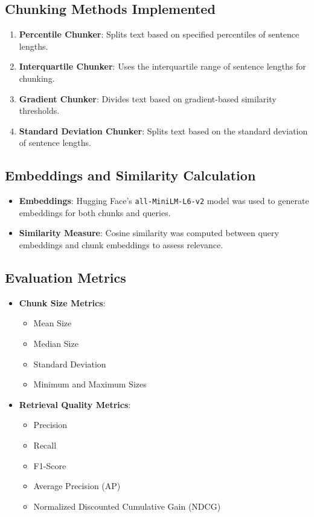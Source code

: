 \documentclass[12pt]{article}
\begin{document}
\subsection{Chunking Methods Implemented}
\begin{enumerate}
    \item \textbf{Percentile Chunker}: Splits text based on specified percentiles of sentence lengths.
    \item \textbf{Interquartile Chunker}: Uses the interquartile range of sentence lengths for chunking.
    \item \textbf{Gradient Chunker}: Divides text based on gradient-based similarity thresholds.
    \item \textbf{Standard Deviation Chunker}: Splits text based on the standard deviation of sentence lengths.
\end{enumerate}

\subsection{Embeddings and Similarity Calculation}
\begin{itemize}
    \item \textbf{Embeddings}: Hugging Face's \texttt{all-MiniLM-L6-v2} model was used to generate embeddings for both chunks and queries.
    \item \textbf{Similarity Measure}: Cosine similarity was computed between query embeddings and chunk embeddings to assess relevance.
\end{itemize}

\subsection{Evaluation Metrics}
\begin{itemize}
    \item \textbf{Chunk Size Metrics}:
    \begin{itemize}
        \item Mean Size
        \item Median Size
        \item Standard Deviation
        \item Minimum and Maximum Sizes
    \end{itemize}
    \item \textbf{Retrieval Quality Metrics}:
    \begin{itemize}
        \item Precision
        \item Recall
        \item F1-Score
        \item Average Precision (AP)
        \item Normalized Discounted Cumulative Gain (NDCG)
    \end{itemize}
\end{itemize}
\end{document}
